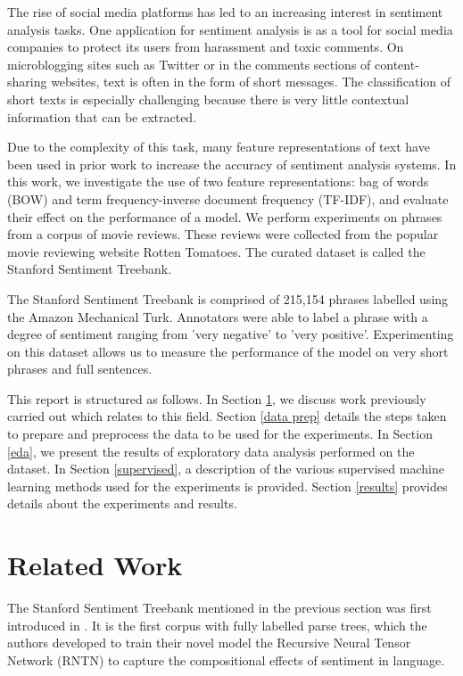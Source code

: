 \documentclass{article}
\begin{document}
The rise of social media platforms has led to an increasing interest in sentiment analysis tasks. One application for sentiment analysis is as a tool for social media companies to protect its users from harassment and toxic comments. On microblogging sites such as Twitter or in the comments sections of content-sharing websites, text is often in the form of short messages. The classification of short texts is especially challenging because there is very little contextual information that can be extracted.

Due to the complexity of this task, many feature representations of text have been used in prior work to increase the accuracy of sentiment analysis systems. In this work, we investigate the use of two feature representations: bag of words (BOW) and term frequency-inverse document frequency (TF-IDF), and evaluate their effect on the performance of a model. We perform experiments on phrases from a corpus of movie reviews. These reviews were collected from the popular movie reviewing website Rotten Tomatoes. The curated dataset is called the Stanford Sentiment Treebank.

The Stanford Sentiment Treebank is comprised of 215,154 phrases labelled using the Amazon Mechanical Turk. Annotators were able to label a phrase with a degree of sentiment ranging from 'very negative' to 'very positive'. Experimenting on this dataset allows us to measure the performance of the model on very short phrases and full sentences. 

This report is structured as follows. In Section \ref{related work}, we discuss work previously carried out which relates to this field. Section \ref{data prep} details the steps taken to prepare and preprocess the data to be used for the experiments. In Section \ref{eda}, we present the results of exploratory data analysis performed on the dataset. In Section \ref{supervised}, a description of the various supervised machine learning methods used for the experiments is provided. Section \ref{results} provides details about the experiments and results.  

\section{Related Work}
\label{related work}

The Stanford Sentiment Treebank mentioned in the previous section was first introduced in \cite{socher2013recursive}. It is the first corpus with fully labelled parse trees, which the authors developed to train their novel model the Recursive Neural Tensor Network (RNTN) to capture the compositional effects of sentiment in language. 
\end{document}

